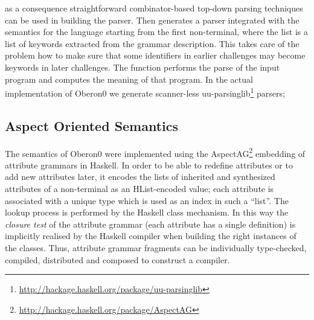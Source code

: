 as a consequence straightforward combinator-based top-down parsing techniques can be used in building the parser. 
Then  generates a parser integrated with the semantics for the language starting from the first non-terminal,
where the list  is a list of keywords extracted from the grammar description. 
This takes care of the problem how to make sure that some identifiers in earlier challenges may become keywords in later challenges. 
The function  performs the parse of the input program and computes the meaning of that program.
In the actual implementation of Oberon0 we generate scanner-less uu-parsinglib\footnote{\url{http://hackage.haskell.org/package/uu-parsinglib}} parsers;





\subsection{Aspect Oriented Semantics}
The semantics of Oberon0 were implemented using the
AspectAG\footnote{\url{http://hackage.haskell.org/package/AspectAG}}
\cite{Viera:Attribute-Grammars} embedding of attribute grammars in Haskell.  
In order to be able to redefine attributes or to add new attributes later, 
it encodes the lists of inherited and synthesized attributes of a
non-terminal as an HList-encoded \cite{KLS04} value; each attribute is associated with a unique type which is used as an index in such a ``list''. The lookup process is performed by the Haskell class mechanism.  
In this way the \emph{closure test} of the attribute grammar
(each attribute has a single definition) is implicitly realised by the Haskell compiler when building the right instances of the classes.
Thus, attribute grammar fragments can be individually
type-checked, compiled, distributed and composed to construct a
compiler.  

